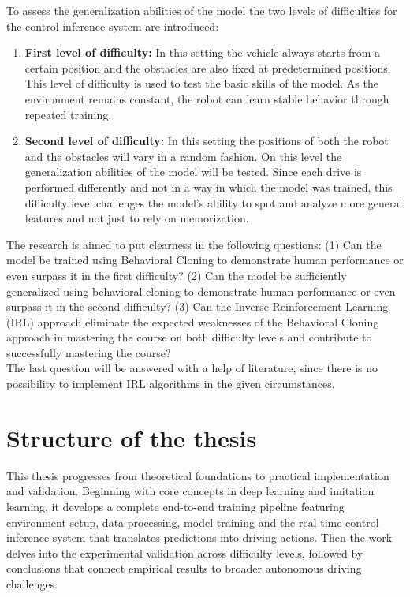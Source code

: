To assess the generalization abilities of the model the two levels of difficulties for the control inference system are introduced:
\begin{enumerate}
  \item \textbf{First level of difficulty:} In this setting the vehicle always starts from a certain position and the obstacles are also fixed at predetermined positions. This level of difficulty is used to test the basic skills of the model. As the environment remains constant, the robot can learn stable behavior through repeated training.
  \item \textbf{Second level of difficulty:} In this setting the positions of both the robot and the obstacles will vary in a random fashion. On this level the generalization abilities of the model will be tested. Since each drive is performed differently and not in a way in which the model was trained, this difficulty level challenges the model's ability to spot and analyze more general features and not just to rely on memorization.
\end{enumerate}

The research is aimed to put clearness in the following questions: (1) Can the model be trained using Behavioral Cloning \autocite{5152385} to demonstrate human performance or even surpass it in the first difficulty? (2) Can the model be sufficiently generalized using behavioral cloning to demonstrate human performance or even surpass it in the second difficulty? (3) Can the Inverse Reinforcement Learning (IRL) \autocite{ng2000algorithms} \autocite{neu2012apprenticeshiplearningusinginverse} \autocites{lee2021approximateinversereinforcementlearning} approach eliminate the expected weaknesses of the Behavioral Cloning approach in mastering the course on both difficulty levels and contribute to successfully mastering the course? \\
The last question will be answered with a help of literature, since there is no possibility to implement IRL algorithms in the given circumstances.

\section{Structure of the thesis}

This thesis progresses from theoretical foundations to practical implementation and validation. Beginning with core concepts in deep learning and imitation learning, it develops a complete end-to-end training pipeline featuring environment setup, data processing, model training and the real-time control inference system that translates predictions into driving actions. Then the work delves into the experimental validation across difficulty levels, followed by conclusions that connect empirical results to broader autonomous driving challenges.